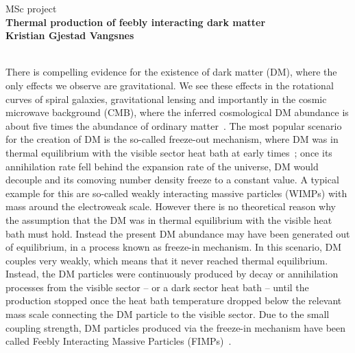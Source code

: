 \documentclass[12pt,a4paper]{article}
\begin{document}
\pagestyle{plain}


 \vspace*{-1.5cm}

\thispagestyle{empty}

{\begin{center}
MSc project \\[1ex]
 {\large \bf  Thermal production of feebly interacting dark matter}\\[0.5ex]
 {\scriptsize \bf Kristian Gjestad Vangsnes}
\end{center}
}
 \vspace*{0.5cm}

\\[1ex]
There is compelling evidence for the existence of dark matter (DM), where the only effects we observe are gravitational. 
We see these effects in the  rotational curves of spiral galaxies, gravitational lensing and importantly in the cosmic 
microwave background (CMB), where the inferred cosmological DM abundance is about five times the abundance of ordinary 
matter~\cite{Planc_colab}.  The most popular scenario for the creation of DM is the so-called freeze-out mechanism,
where DM was in thermal equilibrium with the visible sector heat bath at early times~\cite{Gondolo:1990dk};
once its annihilation rate fell behind the expansion rate of the universe, DM would decouple and its comoving number 
density freeze to a constant value. 
A typical example for this are so-called weakly interacting massive particles (WIMPs) 
with mass around the electroweak scale. However there is no theoretical reason why the assumption that the 
DM was in thermal equilibrium with the visible heat bath must hold. Instead the present DM abundance may have 
been generated out of equilibrium, in a process known as freeze-in mechanism. In this scenario, DM couples very weakly, 
which means that it never reached thermal equilibrium. Instead, the DM particles were continuously produced by decay or 
annihilation processes from the visible sector -- or a dark sector heat bath -- until  the  production  stopped once  the  heat bath 
temperature dropped  below the relevant mass scale connecting the DM particle to the visible sector.  
Due to the small 
coupling strength, DM particles produced via the freeze-in mechanism have been called Feebly Interacting 
Massive Particles (FIMPs)~\cite{FIMP_DM_Summary}. 
\end{document}
